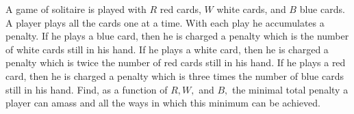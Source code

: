 A game of solitaire is played with $R$ red cards, $W$ white cards, and $B$ blue cards. A player plays all the cards one at a time. With each play he accumulates a penalty. If he plays a blue card, then he is charged a penalty which is the number of white cards still in his hand. If he plays a white card, then he is charged a penalty which is twice the number of red cards still in his hand. If he plays a red card, then he is charged a penalty which is three times the number of blue cards still in his hand. Find, as a function of $R, W,$ and $B,$ the minimal total penalty a player can amass and all the ways in which this minimum can be achieved.